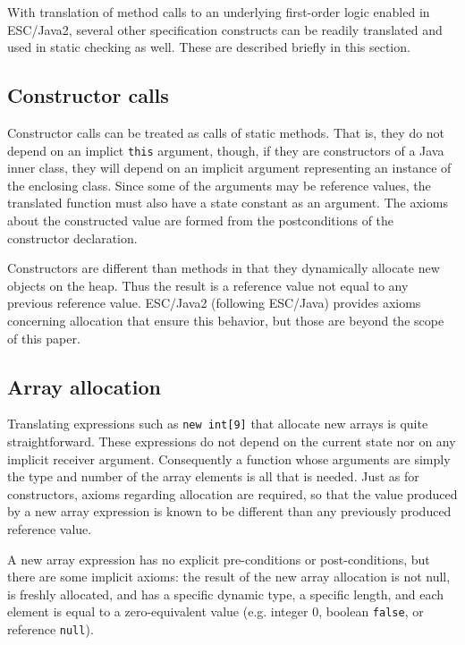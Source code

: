 \documentclass{sig-alternate}
\begin{document}
With translation of method calls to an underlying first-order logic enabled in ESC/Java2, 
several other specification constructs can be readily translated and used in static checking as 
well.  These are described briefly in this section.
 
\subsection{Constructor calls}

Constructor calls can be treated as calls of static methods.  That is, they do not depend on an
implict \texttt{this} argument, though, if they are constructors of a Java inner class, they will depend 
on an implicit argument representing an instance of the enclosing class.  Since some of the 
arguments may be reference values, the translated function must also have a state constant
as an argument.  The axioms about the constructed value are formed from the postconditions
of the constructor declaration.

Constructors are different than methods in that they dynamically allocate new objects on the 
heap.  Thus the result is a reference value not equal to any previous reference value.  ESC/Java2
(following ESC/Java) provides axioms concerning allocation that ensure this behavior, but 
those are beyond the scope of this paper.

\subsection{Array allocation}

Translating expressions such as \texttt{new int[9]} that allocate new arrays is quite straightforward.
These expressions do not depend on the current state nor on any implicit receiver argument.
Consequently a function whose arguments are simply the type and number of the array 
elements is all that is needed.
Just as for constructors, axioms regarding allocation are required, 
so that the value produced by a new array
expression is known to be different than any previously produced reference value.

A new array expression has no explicit pre-conditions or post-conditions, but there are some implicit axioms:
the result of the new array allocation is not null, is freshly allocated,
 and has a specific dynamic type, 
a specific length, and each
element is equal to a zero-equivalent value (e.g. integer 0, boolean \texttt{false}, or
reference \texttt{null}).
\end{document}
